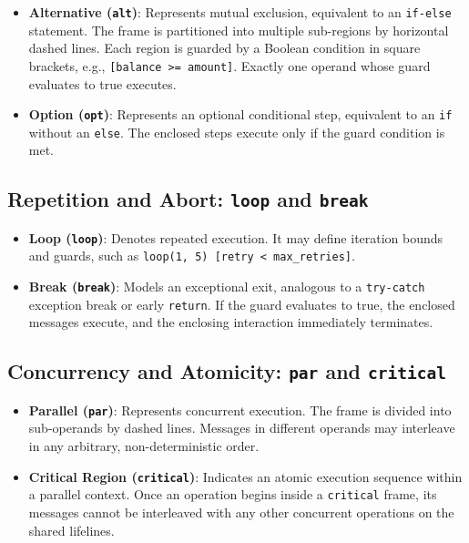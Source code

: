 \begin{itemize}[leftmargin=18pt]
  \item \textbf{Alternative (\texttt{alt})}: Represents mutual exclusion, equivalent to an \texttt{if-else} statement. The frame is partitioned into multiple sub-regions by horizontal dashed lines. Each region is guarded by a Boolean condition in square brackets, e.g., \texttt{[balance >= amount]}. Exactly one operand whose guard evaluates to true executes.
  \item \textbf{Option (\texttt{opt})}: Represents an optional conditional step, equivalent to an \texttt{if} without an \texttt{else}. The enclosed steps execute only if the guard condition is met.
\end{itemize}

\subsection{Repetition and Abort: \texttt{loop} and \texttt{break}}

\begin{itemize}[leftmargin=18pt]
  \item \textbf{Loop (\texttt{loop})}: Denotes repeated execution. It may define iteration bounds and guards, such as \texttt{loop(1, 5) [retry < max\_retries]}.
  \item \textbf{Break (\texttt{break})}: Models an exceptional exit, analogous to a \texttt{try-catch} exception break or early \texttt{return}. If the guard evaluates to true, the enclosed messages execute, and the enclosing interaction immediately terminates.
\end{itemize}

\subsection{Concurrency and Atomicity: \texttt{par} and \texttt{critical}}

\begin{itemize}[leftmargin=18pt]
  \item \textbf{Parallel (\texttt{par})}: Represents concurrent execution. The frame is divided into sub-operands by dashed lines. Messages in different operands may interleave in any arbitrary, non-deterministic order.
  \item \textbf{Critical Region (\texttt{critical})}: Indicates an atomic execution sequence within a parallel context. Once an operation begins inside a \texttt{critical} frame, its messages cannot be interleaved with any other concurrent operations on the shared lifelines.
\end{itemize}

